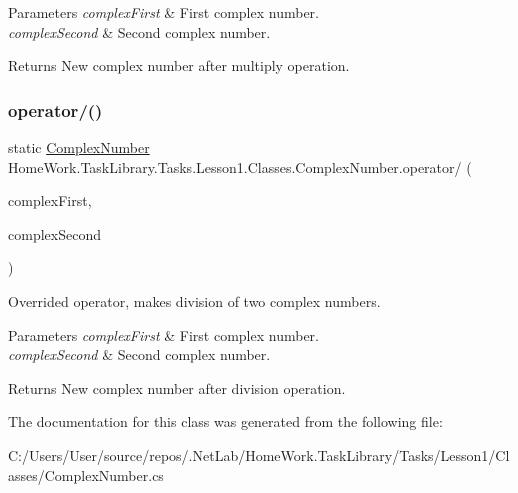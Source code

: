 \begin{DoxyParams}{Parameters}
{\em complex\+First} & First complex number.\\
\hline
{\em complex\+Second} & Second complex number.\\
\hline
\end{DoxyParams}
\begin{DoxyReturn}{Returns}
New complex number after multiply operation.
\end{DoxyReturn}
\mbox{\label{class_home_work_1_1_task_library_1_1_tasks_1_1_lesson1_1_1_classes_1_1_complex_number_a7e8afa463d2d87d0f2e035fb2e3ed35b}} 
\subsubsection{\texorpdfstring{operator/()}{operator/()}}
{\footnotesize\ttfamily static \mbox{\hyperlink{class_home_work_1_1_task_library_1_1_tasks_1_1_lesson1_1_1_classes_1_1_complex_number}{Complex\+Number}} Home\+Work.\+Task\+Library.\+Tasks.\+Lesson1.\+Classes.\+Complex\+Number.\+operator/ (\begin{DoxyParamCaption}\item[{\mbox{\hyperlink{class_home_work_1_1_task_library_1_1_tasks_1_1_lesson1_1_1_classes_1_1_complex_number}{Complex\+Number}}}]{complex\+First,  }\item[{\mbox{\hyperlink{class_home_work_1_1_task_library_1_1_tasks_1_1_lesson1_1_1_classes_1_1_complex_number}{Complex\+Number}}}]{complex\+Second }\end{DoxyParamCaption})\hspace{0.3cm}{\ttfamily [static]}}



Overrided operator, makes division of two complex numbers. 


\begin{DoxyParams}{Parameters}
{\em complex\+First} & First complex number.\\
\hline
{\em complex\+Second} & Second complex number.\\
\hline
\end{DoxyParams}
\begin{DoxyReturn}{Returns}
New complex number after division operation.
\end{DoxyReturn}


The documentation for this class was generated from the following file\+:\begin{DoxyCompactItemize}
\item 
C\+:/\+Users/\+User/source/repos/.\+Net\+Lab/\+Home\+Work.\+Task\+Library/\+Tasks/\+Lesson1/\+Classes/Complex\+Number.\+cs\end{DoxyCompactItemize}
